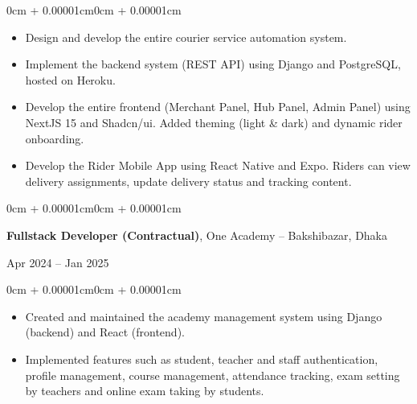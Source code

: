 \documentclass[10pt, letterpaper]{article}
\newenvironment{highlights}{
  \begin{itemize}[
    topsep=0.10cm,
    parsep=0.10cm,
    partopsep=0pt,
    itemsep=0pt,
    leftmargin=0cm + 10pt
  ]
}{
  \end{itemize}
}
\newenvironment{onecolentry}{\begin{adjustwidth}{0cm + 0.00001cm}{0cm + 0.00001cm}}{\end{adjustwidth}}
\newenvironment{twocolentry}[2][]{
  \onecolentry
  \def\secondColumn{#2}
  \setcolumnwidth{\fill, 4.5cm}
  \begin{paracol}{2}
}{
  \switchcolumn \raggedleft \secondColumn
  \end{paracol}
  \endonecolentry
}
\begin{document}
\begin{onecolentry}
  \begin{highlights}
    \item Design and develop the entire courier service automation system.
    \item Implement the backend system (REST API) using Django and PostgreSQL, hosted on Heroku.
    \item Develop the entire frontend (Merchant Panel, Hub Panel, Admin Panel) using NextJS 15 and Shadcn/ui. Added theming (light \& dark) and dynamic rider onboarding.
    \item Develop the Rider Mobile App using React Native and Expo. Riders can view delivery assignments, update delivery status and tracking content.
  \end{highlights}
\end{onecolentry}

\vspace{0.20cm}

\begin{twocolentry}{Apr 2024 -- Jan 2025}
  \textbf{Fullstack Developer (Contractual)}, One Academy -- Bakshibazar, Dhaka
\end{twocolentry}

\vspace{0.10cm}

\begin{onecolentry}
  \begin{highlights}
    \item Created and maintained the academy management system using Django (backend) and React (frontend).
    \item Implemented features such as student, teacher and staff authentication, profile management, course management, attendance tracking, exam setting by teachers and online exam taking by students.
  \end{highlights}
\end{onecolentry}


\end{document}
